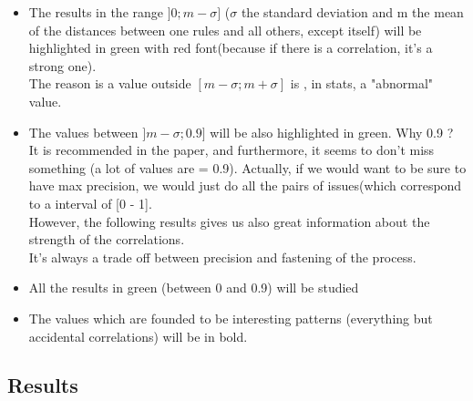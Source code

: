 \documentclass{article}
\begin{document}
\begin{itemize}

\item The results in the range $]0 ; m-\sigma]$ ($\sigma$ the standard deviation and m the mean of the distances between one rules and all others, except itself) will be highlighted in green with red font(because if there is a correlation, it's a strong one). \\
The reason is a value outside $[m-\sigma ; m+\sigma]$ is , in stats, a "abnormal" value. 


\item The values between $]m-\sigma;0.9]$ will be also highlighted in green. Why 0.9 ? It is recommended in the paper, and furthermore, it seems to don't miss something (a lot of values are = 0.9). Actually, if we would want to be sure to have max precision, we would just do all the pairs of issues(which correspond to a interval of [0 - 1]. \\ However, the following results gives us also great information about the strength of the correlations. \\
It's always a trade off between precision and fastening of the process. \\

\item  All the results in green (between 0 and 0.9) will be studied \\

\item The values which are founded to be interesting patterns (everything but accidental correlations) will be in bold.

\end{itemize}

\subsection{Results} 
\end{document}
